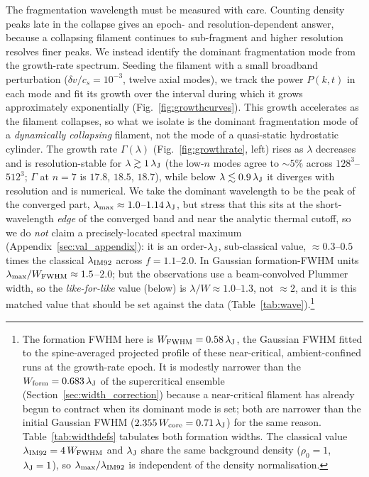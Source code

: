 \documentclass[usenatbib,twoside,twocolumn]{mnras}
\begin{document}
The fragmentation wavelength must be measured with care. Counting density peaks late in the collapse gives an epoch- and resolution-dependent answer, because a collapsing filament continues to sub-fragment and higher resolution resolves finer peaks. We instead identify the dominant fragmentation mode from the growth-rate spectrum. Seeding the filament with a small broadband perturbation ($\delta v/c_s=10^{-3}$, twelve axial modes), we track the power $P(k,t)$ in each mode and fit its growth over the interval during which it grows approximately exponentially (Fig.~\ref{fig:growthcurves}). This growth accelerates as the filament collapses, so what we isolate is the dominant fragmentation mode of a \emph{dynamically collapsing} filament, not the mode of a quasi-static hydrostatic cylinder. The growth rate $\Gamma(\lambda)$ (Fig.~\ref{fig:growthrate}, left) rises as $\lambda$ decreases and is resolution-stable for $\lambda\gtrsim1\,\lambda_{\rm J}$ (the low-$n$ modes agree to $\sim5\%$ across $128^3$--$512^3$; $\Gamma$ at $n=7$ is $17.8$, $18.5$, $18.7$), while below $\lambda\lesssim0.9\,\lambda_{\rm J}$ it diverges with resolution and is numerical. We take the dominant wavelength to be the peak of the converged part, $\lambda_{\rm max}\approx1.0$--$1.14\,\lambda_{\rm J}$, but stress that this sits at the short-wavelength \emph{edge} of the converged band and near the analytic thermal cutoff, so we do \emph{not} claim a precisely-located spectral maximum (Appendix~\ref{sec:val_appendix}): it is an order-$\lambda_{\rm J}$, sub-classical value, $\approx0.3$--$0.5$ times the classical $\lambda_{\rm IM92}$ across $f=1.1$--$2.0$. In Gaussian formation-FWHM units $\lambda_{\rm max}/W_{\rm FWHM}\approx1.5$--$2.0$; but the observations use a beam-convolved Plummer width, so the \emph{like-for-like} value (below) is $\lambda/W\approx1.0$--$1.3$, not $\approx2$, and it is this matched value that should be set against the data (Table~\ref{tab:wave}).\footnote{The formation FWHM here is $W_{\rm FWHM}=0.58\,\lambda_{\rm J}$, the Gaussian FWHM fitted to the spine-averaged projected profile of these near-critical, ambient-confined runs at the growth-rate epoch. It is modestly narrower than the $W_{\rm form}=0.683\,\lambda_{\rm J}$ of the supercritical ensemble (Section~\ref{sec:width_correction}) because a near-critical filament has already begun to contract when its dominant mode is set; both are narrower than the initial Gaussian FWHM ($2.355\,W_{\rm core}=0.71\,\lambda_{\rm J}$) for the same reason. Table~\ref{tab:widthdefs} tabulates both formation widths. The classical value $\lambda_{\rm IM92}=4\,W_{\rm FWHM}$ and $\lambda_{\rm J}$ share the same background density ($\rho_0=1$, $\lambda_{\rm J}=1$), so $\lambda_{\rm max}/\lambda_{\rm IM92}$ is independent of the density normalisation.}
\end{document}
